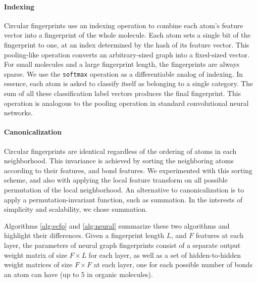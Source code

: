 \documentclass{article}
\begin{document}
\paragraph{Indexing}
Circular fingerprints use an indexing operation to combine each atom's feature vector into a fingerprint of the whole molecule.
Each atom sets a single bit of the fingerprint to one, at an index determined by the hash of its feature vector.
This pooling-like operation converts an arbitrary-sized graph into a fixed-sized vector.
For small molecules and a large fingerprint length, the fingerprints are always sparse.
We use the \texttt{softmax} operation as a differentiable analog of indexing.
In essence, each atom is asked to classify itself as belonging to a single category.
The sum of all these classification label vectors produces the final fingerprint.
This operation is analogous to the pooling operation in standard convolutional neural networks.

\paragraph{Canonicalization}
Circular fingerprints are identical regardless of the ordering of atoms in each neighborhood.
This invariance is achieved by sorting the neighboring atoms according to their features, and bond features.
We experimented with this sorting scheme, and also with applying the local feature transform on all possible permutation of the local neighborhood.
An alternative to canonicalization is to apply a permutation-invariant function, such as summation.
In the interests of simplicity and scalability, we chose summation.

Algorithms \ref{alg:ecfp} and \ref{alg:neural} summarize these two algorithms and highlight their differences.
Given a fingerprint length $L$, and $F$ features at each layer, the parameters of neural graph fingerprints consist of a separate output weight matrix of size $F \times L$ for each layer, as well as a set of hidden-to-hidden weight matrices of size $F \times F$ at each layer, one for each possible number of bonds an atom can have (up to 5 in organic molecules).
\end{document}
